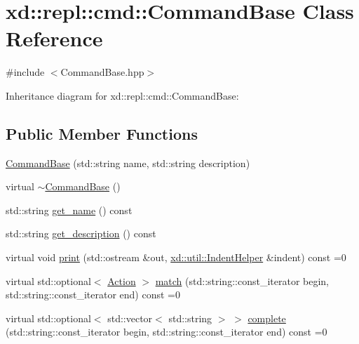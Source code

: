 \hypertarget{classxd_1_1repl_1_1cmd_1_1_command_base}{}\section{xd\+:\+:repl\+:\+:cmd\+:\+:Command\+Base Class Reference}
\label{classxd_1_1repl_1_1cmd_1_1_command_base}


{\ttfamily \#include $<$Command\+Base.\+hpp$>$}



Inheritance diagram for xd\+:\+:repl\+:\+:cmd\+:\+:Command\+Base\+:
\subsection*{Public Member Functions}
\begin{DoxyCompactItemize}
\item 
\mbox{\hyperlink{classxd_1_1repl_1_1cmd_1_1_command_base_abfcd0bbac615a492543d1298dac40c03}{Command\+Base}} (std\+::string name, std\+::string description)
\item 
virtual \mbox{\hyperlink{classxd_1_1repl_1_1cmd_1_1_command_base_a63bfd93b6973b7459695ad353f37670a}{$\sim$\+Command\+Base}} ()
\item 
std\+::string \mbox{\hyperlink{classxd_1_1repl_1_1cmd_1_1_command_base_a50ad757813a5fce8d3eba7ece771ba78}{get\+\_\+name}} () const
\item 
std\+::string \mbox{\hyperlink{classxd_1_1repl_1_1cmd_1_1_command_base_a5f7ed2376a2c46d5ef72bbcd7609ce52}{get\+\_\+description}} () const
\item 
virtual void \mbox{\hyperlink{classxd_1_1repl_1_1cmd_1_1_command_base_acb731ef346c5c1eccce3c88749fed8e8}{print}} (std\+::ostream \&out, \mbox{\hyperlink{classxd_1_1util_1_1_indent_helper}{xd\+::util\+::\+Indent\+Helper}} \&indent) const =0
\item 
virtual std\+::optional$<$ \mbox{\hyperlink{namespacexd_1_1repl_1_1cmd_a7274841bd02a9c5da0ba48ae204ab3d5}{Action}} $>$ \mbox{\hyperlink{classxd_1_1repl_1_1cmd_1_1_command_base_adc60ebee9e6b13fd4e9305bd436555ee}{match}} (std\+::string\+::const\+\_\+iterator begin, std\+::string\+::const\+\_\+iterator end) const =0
\item 
virtual std\+::optional$<$ std\+::vector$<$ std\+::string $>$ $>$ \mbox{\hyperlink{classxd_1_1repl_1_1cmd_1_1_command_base_a38bae861ceff52dfd3efa19aefbc3971}{complete}} (std\+::string\+::const\+\_\+iterator begin, std\+::string\+::const\+\_\+iterator end) const =0
\end{DoxyCompactItemize}


